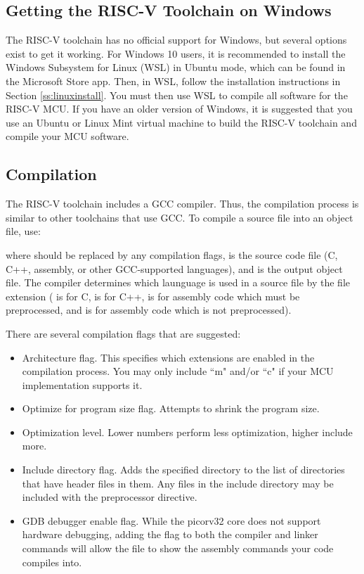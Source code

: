 \documentclass[11pt,pdftex,portrait,letterpaper]{article}
\begin{document}
\subsection{Getting the RISC-V Toolchain on Windows}
The RISC-V toolchain has no official support for Windows, but several options exist to get it working. For Windows 10 users, it is recommended to install the Windows Subsystem for Linux (WSL) in Ubuntu mode, which can be found in the Microsoft Store app. Then, in WSL, follow the installation instructions in Section \ref{ss:linuxinstall}. You must then use WSL to compile all software for the RISC-V MCU.
If you have an older version of Windows, it is suggested that you use an Ubuntu or Linux Mint virtual machine to build the RISC-V toolchain and compile your MCU software.

\subsection{Compilation}
The RISC-V toolchain includes a GCC compiler. Thus, the compilation process is similar to other toolchains that use GCC. To compile a source file into an object file, use:

\noindent{}
\noindent where  should be replaced by any compilation flags,  is the source code file (C, C++, assembly, or other GCC-supported languages), and  is the output object file. The compiler determines which launguage is used in a source file by the file extension ( is for C,  is for C++,  is for assembly code which must be preprocessed, and  is for assembly code which is not preprocessed).

There are several compilation flags that are suggested:
\begin{itemize}
\item {} Architecture flag. This specifies which extensions are enabled in the compilation process. You may only include ``m" and/or ``c" if your MCU implementation supports it.
\item {} Optimize for program size flag. Attempts to shrink the program size.
\item {} Optimization level. Lower numbers perform less optimization, higher include more.
\item {} Include directory flag. Adds the specified directory to the list of directories that have header files in them. Any files in the include directory may be included with the  preprocessor directive.
\item {} GDB debugger enable flag. While the picorv32 core does not support hardware debugging, adding the  flag to both the compiler and linker commands will allow the  file to show the assembly commands your code compiles into.
\end{itemize}
\end{document}
